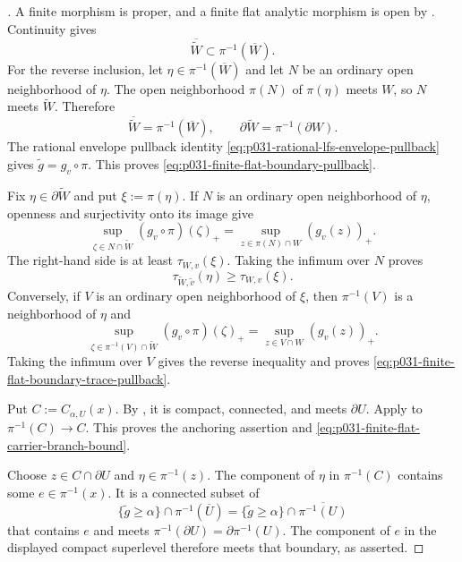 \begin{proof}[]
A finite morphism is proper, and a finite flat analytic morphism is open
by \cite[proof of Proposition~5.11, p.~175]{GJR26}.  Continuity gives
\[
       \overline{\widetilde W}\subset\pi^{-1}(\overline W).
\]
For the reverse inclusion, let $\eta\in\pi^{-1}(\overline W)$ and let
$N$ be an ordinary open neighborhood of $\eta$.  The open neighborhood
$\pi(N)$ of $\pi(\eta)$ meets $W$, so $N$ meets $\widetilde W$.
Therefore
\[
 \overline{\widetilde W}=\pi^{-1}(\overline W),
 \qquad
 \partial\widetilde W=\pi^{-1}(\partial W).
\]
The rational envelope pullback identity
\eqref{eq:p031-rational-lfs-envelope-pullback} gives
$\widetilde g=g_v\circ\pi$.  This proves
\eqref{eq:p031-finite-flat-boundary-pullback}.

Fix $\eta\in\partial\widetilde W$ and put $\xi:=\pi(\eta)$.  If $N$ is
an ordinary open neighborhood of $\eta$, openness and surjectivity onto
its image give
\[
 \sup_{\zeta\in N\cap\widetilde W}(g_v\circ\pi)(\zeta)_+
   =\sup_{z\in\pi(N)\cap W}(g_v(z))_+.
\]
The right-hand side is at least $\tau_{W,v}(\xi)$.  Taking the infimum
over $N$ proves
\[
                  \tau_{\widetilde W,\widetilde v}(\eta)
                         \geq\tau_{W,v}(\xi).
\]
Conversely, if $V$ is an ordinary open neighborhood of $\xi$, then
$\pi^{-1}(V)$ is a neighborhood of $\eta$ and
\[
 \sup_{\zeta\in\pi^{-1}(V)\cap\widetilde W}
        (g_v\circ\pi)(\zeta)_+
   =\sup_{z\in V\cap W}(g_v(z))_+.
\]
Taking the infimum over $V$ gives the reverse inequality and proves
\eqref{eq:p031-finite-flat-boundary-trace-pullback}.

Put $C:=C_{\alpha,U}(x)$.  By
, it is compact, connected, and
meets $\partial U$.  Apply
 to
$\pi^{-1}(C)\to C$.  This proves the anchoring assertion and
\eqref{eq:p031-finite-flat-carrier-branch-bound}.

Choose $z\in C\cap\partial U$ and
$\eta\in\pi^{-1}(z)$.  The component of $\eta$ in $\pi^{-1}(C)$ contains
some $e\in\pi^{-1}(x)$.  It is a connected subset of
\[
 \{\widetilde g\geq\alpha\}
       \cap\pi^{-1}(\overline U)
  =\{\widetilde g\geq\alpha\}
       \cap\overline{\pi^{-1}(U)}
\]
that contains $e$ and meets
$\pi^{-1}(\partial U)=\partial\pi^{-1}(U)$.  The component of $e$ in the
displayed compact superlevel therefore meets that boundary, as asserted.
\end{proof}
